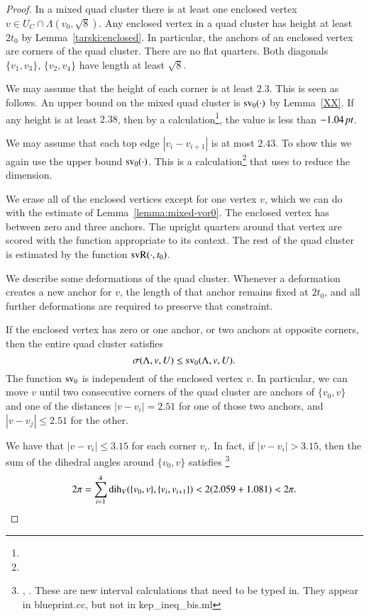 \begin{proof}
In a mixed quad cluster there is at least one enclosed vertex
$v \in U_C\cap \Lambda(v_0,\sqrt8)$.
Any enclosed vertex in a quad cluster has height at least $2t_0$
by Lemma~\ref{tarski:enclosed}. In particular, the anchors of an
enclosed vertex are corners of the quad cluster. There are no flat
quarters.  Both diagonals $\{v_1,v_3\}$, $\{v_2,v_4\}$ have length
at least $\sqrt8$.

We may assume that the height of each corner is at least $2.3$.
This is seen as follows.  An upper bound on the mixed quad cluster
is ${\operatorname{sv}}_0(\cdot)$ by Lemma~\ref{XX}.  If any height is at least
$2.38$, then by a calculation\footnote{},
the value is less than $-1.04\,\hbox{\it pt}$.

We may assume that each top edge $|v_i-v_{i+1}|$ is at most $2.43$.
To show this we again use the upper bound ${\operatorname{sv}}_0(\cdot)$.
This is a calculation\footnote{} that uses
to reduce the dimension.


We erase all of the enclosed vertices except for one vertex $v$, which
we can do with the estimate of Lemma~\ref{lemma:mixed-vor0}.
The enclosed vertex has between zero and three anchors.
The upright
quarters around that vertex are scored with the function appropriate
to its context.
The rest of the quad cluster is estimated by the function ${\operatorname{svR}}(\cdot,t_0)$.

\bigskip
We describe some deformations of the quad cluster.  Whenever a deformation
creates a new anchor for $v$, the length of that anchor remains fixed at $2t_0$,
and all further deformations are required to preserve that constraint.

If the enclosed vertex has zero  or one anchor, or two anchors at opposite corners,
then the entire quad
cluster satisfies $$\sigma(\Lambda,v,U)\le {\operatorname{sv}}_0(\Lambda,v,U).$$
The function ${\operatorname{sv}}_0$ is independent of the enclosed
vertex $v$.  In particular, we can move $v$ until 
two consecutive  corners of the quad cluster are anchors of $\{v_0,v\}$
and one of the distances $|v-v_i|=2.51$ for one of those two anchors,
and $|v-v_j|\le 2.51$ for the other.

We have that $|v-v_i|\le 3.15$ for each corner $v_i$.
In fact, if $|v-v_i| > 3.15$,
then the sum of the dihedral angles around $\{v_0,v\}$ satisfies%
\footnote{, .  
These are new interval calculations 
  that need to be typed in.  They appear in blueprint.cc, but not in kep\_ineq\_bis.ml}
 $$
 2\pi = \sum_{i=1}^4 \operatorname{dih}_V(\{v_0,v\},\{v_i,v_{i+1}\}) < 2(2.059+1.081) < 2\pi.
 $$


\end{proof}
